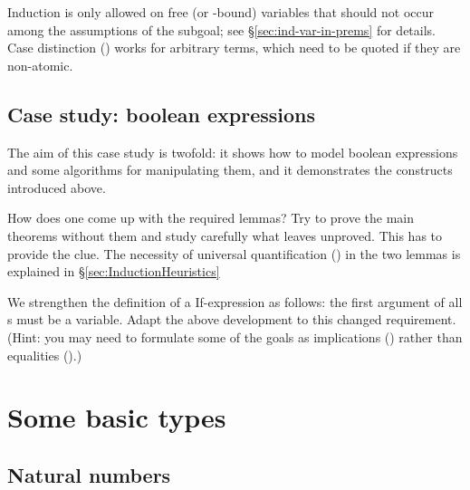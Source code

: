 \begin{exercise}\label{ex:Tree}
%
\end{exercise}



\begin{warn}
  Induction is only allowed on free (or \isasymAnd-bound) variables that
  should not occur among the assumptions of the subgoal; see
  \S\ref{sec:ind-var-in-prems} for details. Case distinction
  () works for arbitrary terms, which need to be
  quoted if they are non-atomic.
\end{warn}


\subsection{Case study: boolean expressions}
\label{sec:boolex}

The aim of this case study is twofold: it shows how to model boolean
expressions and some algorithms for manipulating them, and it demonstrates
the constructs introduced above.


\medskip

How does one come up with the required lemmas? Try to prove the main theorems
without them and study carefully what  leaves unproved. This has
to provide the clue.  The necessity of universal quantification
() in the two lemmas is explained in
\S\ref{sec:InductionHeuristics}

\begin{exercise}
  We strengthen the definition of a  If-expression as follows:
  the first argument of all s must be a variable. Adapt the above
  development to this changed requirement. (Hint: you may need to formulate
  some of the goals as implications (\isasymimp) rather than equalities
  (\isa{=}).)
\end{exercise}

\section{Some basic types}


\subsection{Natural numbers}
\label{sec:nat}




